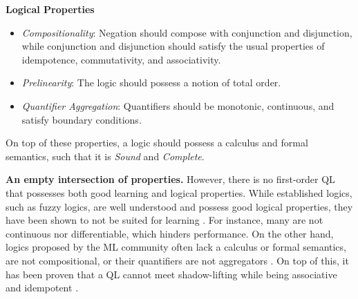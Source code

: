 \textbf{Logical Properties}
\begin{itemize}
    \item \textit{Compositionality}: Negation should compose with conjunction and disjunction, while conjunction and disjunction should satisfy the usual properties of idempotence, commutativity, and associativity.
    \item \textit{Prelinearity}: The logic should possess a notion of total order. 
    \item \textit{Quantifier Aggregation}: Quantifiers should be monotonic, continuous, and satisfy boundary conditions.
\end{itemize}
On top of these properties, a logic should possess a calculus and formal semantics, such that it is \textit{Sound} and \textit{Complete}. 

\textbf{An empty intersection of properties.} However, there is no first-order QL that possesses both good learning and logical properties. While established logics, such as fuzzy logics, are well understood and possess good logical properties, they have been shown to not be suited for learning \citep{van2022analyzing, affeldt2024taming, FLINKOW2025103280}. For instance, many are not continuous nor differentiable, which hinders performance. On the other hand, logics proposed by the ML community often lack a calculus or formal semantics, are not compositional, or their quantifiers are not aggregators \citep{van2022analyzing, affeldt2024taming}. On top of this, it has been proven that a QL cannot meet shadow-lifting while being associative and idempotent \citep{varnai2020robustness}.

